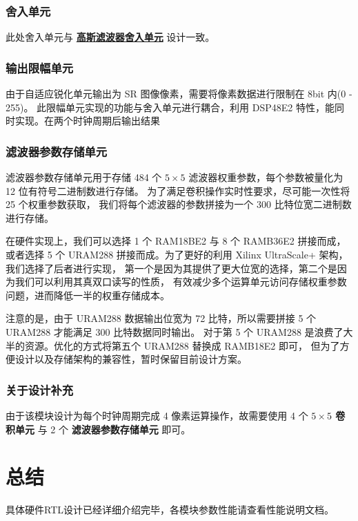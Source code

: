 \documentclass[12pt, a4paper, oneside]{ctexbook}
\begin{document}
	\subsection{舍入单元}
	此处舍入单元与 \hyperref[round_unit]{\textbf{高斯滤波器舍入单元}} 设计一致。		
	\subsection{输出限幅单元}
	由于自适应锐化单元输出为 SR 图像像素，需要将像素数据进行限制在 8bit 内(0 - 255)。
	此限幅单元实现的功能与舍入单元进行耦合，利用 DSP48E2 特性，能同时实现。在两个时钟周期后输出结果
	\subsection{滤波器参数存储单元}
	滤波器参数存储单元用于存储 484 个 $5\times5$ 滤波器权重参数，每个参数被量化为 12 位有符号二进制数进行存储。
	为了满足卷积操作实时性要求，尽可能一次性将 25 个权重参数获取，
	我们将每个滤波器的参数拼接为一个 300 比特位宽二进制数进行存储。
	\par 在硬件实现上，我们可以选择 1 个 RAM18BE2 与 8 个 RAMB36E2 拼接而成，
	或者选择 5 个 URAM288 拼接而成。为了更好的利用 Xilinx UltraScale+ 架构，我们选择了后者进行实现，
	第一个是因为其提供了更大位宽的选择，第二个是因为我们可以利用其真双口读写的性质，
	有效减少多个运算单元访问存储权重参数问题，进而降低一半的权重存储成本。
	\par 注意的是，由于 URAM288 数据输出位宽为 72 比特，所以需要拼接 5 个 URAM288 才能满足 300 比特数据同时输出。
	对于第 5 个 URAM288 是浪费了大半的资源。优化的方式将第五个 URAM288 替换成 RAMB18E2 即可，
	但为了方便设计以及存储架构的兼容性，暂时保留目前设计方案。
	\subsection{关于设计补充} 
	由于该模块设计为每个时钟周期完成 4 像素运算操作，故需要使用 4 个 \textbf{ $5\times5$ 卷积单元} 与 2 个 \textbf{滤波器参数存储单元} 即可。
	
	\chapter{总结}
	具体硬件RTL设计已经详细介绍完毕，各模块参数性能请查看性能说明文档。
	
\end{document}

